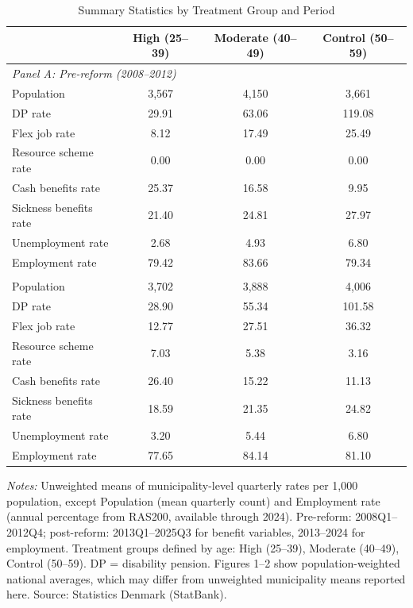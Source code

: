 \begin{table}[htbp]
\centering
\caption{Summary Statistics by Treatment Group and Period}
\label{tab:summary}
\small
\begin{tabular}{l*{3}{c}}
\toprule
 & High (25--39) & Moderate (40--49) & Control (50--59) \\
\midrule
\multicolumn{4}{l}{\textit{Panel A: Pre-reform (2008--2012)}} \\
\addlinespace
Population & 3,567 & 4,150 & 3,661 \\
DP rate & 29.91 & 63.06 & 119.08 \\
Flex job rate & 8.12 & 17.49 & 25.49 \\
Resource scheme rate & 0.00 & 0.00 & 0.00 \\
Cash benefits rate & 25.37 & 16.58 & 9.95 \\
Sickness benefits rate & 21.40 & 24.81 & 27.97 \\
Unemployment rate & 2.68 & 4.93 & 6.80 \\
Employment rate & 79.42 & 83.66 & 79.34 \\
\addlinespace
\midrule
\multicolumn{4}{l}{\textit{Panel B: Post-reform (2013--2025)}} \\
\addlinespace
Population & 3,702 & 3,888 & 4,006 \\
DP rate & 28.90 & 55.34 & 101.58 \\
Flex job rate & 12.77 & 27.51 & 36.32 \\
Resource scheme rate & 7.03 & 5.38 & 3.16 \\
Cash benefits rate & 26.40 & 15.22 & 11.13 \\
Sickness benefits rate & 18.59 & 21.35 & 24.82 \\
Unemployment rate & 3.20 & 5.44 & 6.80 \\
Employment rate & 77.65 & 84.14 & 81.10 \\
\bottomrule
\end{tabular}
\begin{tablenotes}
\small
\item \textit{Notes:} Unweighted means of municipality-level quarterly rates per 1,000 population, except Population (mean quarterly count) and Employment rate (annual percentage from RAS200, available through 2024). Pre-reform: 2008Q1--2012Q4; post-reform: 2013Q1--2025Q3 for benefit variables, 2013--2024 for employment. Treatment groups defined by age: High (25--39), Moderate (40--49), Control (50--59). DP = disability pension. Figures 1--2 show population-weighted national averages, which may differ from unweighted municipality means reported here. Source: Statistics Denmark (StatBank).
\end{tablenotes}
\end{table}
